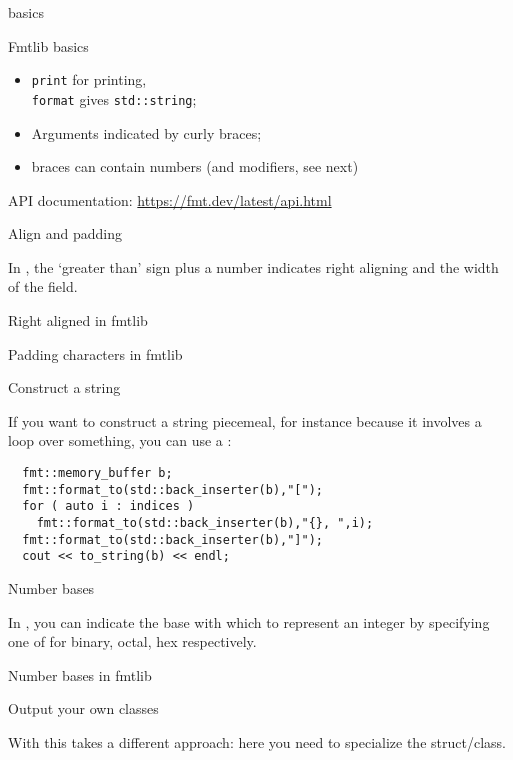  {basics}

\begin{block}{Fmtlib basics}
  \label{sl:fmtlib-basic}
  \begin{itemize}
  \item \lstinline{print} for printing,\\
    \lstinline{format} gives \lstinline+std::string+;
  \item Arguments indicated by curly braces;
  \item braces can contain numbers (and modifiers, see next)
  \end{itemize}
  API documentation:
  \url{https://fmt.dev/latest/api.html}
\end{block}

 {Align and padding}

In , the `greater than' sign plus a number indicates
right aligning and the width of the field.

\begin{block}{Right aligned in fmtlib}
  \label{sl:fmtwidth}
\end{block}

\begin{block}{Padding characters in fmtlib}
  \label{sl:fmtleftpad}
\end{block}

 {Construct a string}

If you want to construct a string piecemeal,
for instance because it involves a loop over something,
you can use a :
\begin{lstlisting}
  fmt::memory_buffer b;
  fmt::format_to(std::back_inserter(b),"[");
  for ( auto i : indices )
    fmt::format_to(std::back_inserter(b),"{}, ",i);
  fmt::format_to(std::back_inserter(b),"]");
  cout << to_string(b) << endl;
\end{lstlisting}

 {Number bases}

In , you can indicate the base with which to represent an integer
by specifying one of  for binary, octal, hex respectively.

\begin{block}{Number bases in fmtlib}
  \label{sl:fmtbase}
\end{block}

 {Output your own classes}

With  this takes a different approach:
here you need to specialize the  struct/class.
%

